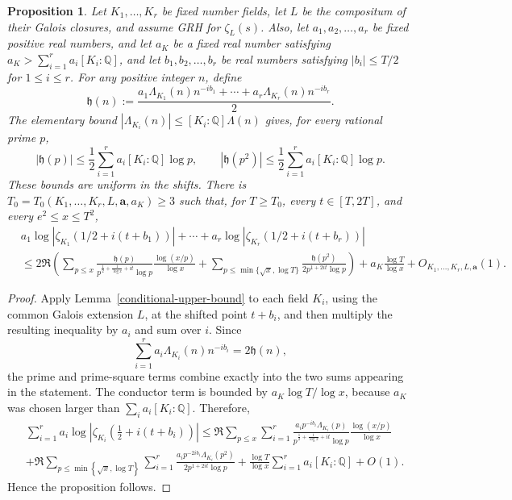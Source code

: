 \documentclass[twoside,reqno,11pt,a4paper]{amsart}
\numberwithin{equation}{section}
\theoremstyle{plain}
\newtheorem{prop}[thm]{Proposition}
\theoremstyle{definition}
\theoremstyle{remark}
\renewcommand{\le}{\leqslant}
\renewcommand{\ge}{\geqslant}
\begin{document}
	\begin{prop}\label{main-prop} 
Let $K_1,\ldots, K_r$ be fixed number fields, let $L$ be the compositum of their Galois closures, and assume GRH for $\zeta_L(s)$. Also, let $a_1,a_2,\ldots,a_r$  be fixed positive real numbers, and let $a_K$ be a fixed real number satisfying $a_K>\sum_{i=1}^r a_i[K_i:\mathbb{Q}]$,
and let $b_1,b_2,\ldots,b_r$ be real numbers satisfying
$|b_i|\le  T/2$ for $1\le  i\le  r$. For any positive integer $n$, define
\begin{equation}\label{eq:def-h}
\mathfrak{h}(n):=\frac{a_1\Lambda_{K_1}(n)n^{-ib_1}+\cdots+a_r\Lambda_{K_r}(n)n^{-ib_r}}{2}.
\end{equation}
The elementary bound $|\Lambda_{K_i}(n)|\le[K_i:\mathbb Q]\Lambda(n)$ gives, for every rational prime $p$,
\begin{equation}\label{eq:h-prime-uniform-bounds}
        |\mathfrak h(p)|\le\frac12\sum_{i=1}^ra_i[K_i:\mathbb Q]\log p,
        \qquad
        |\mathfrak h(p^2)|\le\frac12\sum_{i=1}^ra_i[K_i:\mathbb Q]\log p.
\end{equation}
These bounds are uniform in the shifts.
There is $T_0=T_0(K_1,\ldots,K_r,L,\mathbf a,a_K)\ge3$ such that, for $T\ge T_0$, every $t\in[T,2T]$, and every $e^2\le x\le T^2$, \begin{align*}
			&a_1\log\left| \zeta_{K_1}\left(1/2+i(t+b_1)\right)\right| +\cdots + 	a_r\log\left| \zeta_{K_r}\left(1/2+i(t+b_r)\right)\right| \\
			& \le  2\Re\left( \sum_{p\le  x} \frac{\mathfrak{h}(p)}{p^{\frac{1}{2}+\frac{1}{\log x}+it}\log p} \frac{\log\left(x/p\right)}{\log x}+ \sum_{p\le  \min\{ \sqrt{x},\log T\}} \frac{\mathfrak{h}(p^2)}{2p^{1+2it}\log p}\right) + a_K \frac{\log T}{\log x} +O_{K_1,\ldots,K_r,L,\mathbf a}(1).
		\end{align*}
	\end{prop}
	\begin{proof}
Apply Lemma~\ref{conditional-upper-bound} to each field $K_i$, using the common Galois extension $L$, at the shifted point $t+b_i$, and then multiply the resulting inequality by $a_i$ and sum over $i$.  Since
\begin{equation*}
        \sum_{i=1}^ra_i\Lambda_{K_i}(n)n^{-ib_i}=2\mathfrak h(n),
\end{equation*}
the prime and prime-square terms combine exactly into the two sums appearing in the statement.  The conductor term is bounded by $a_K\log T/\log x$, because $a_K$ was chosen larger than $\sum_i a_i[K_i:\mathbb Q]$. Therefore,
		\begin{align*}
		&	\sum_{i=1}^r a_i \log|\zeta_{K_i}\left(\tfrac{1}{2}+i(t+b_i)\right)|\le \Re\sum_{p\le  x}	\sum_{i=1}^r  \frac{a_ip^{-ib_i}\Lambda_{K_i}(p)}{p^{\frac{1}{2}+\frac{1}{\log x}+ it}\log p} \frac{\log\left(x/p\right)}{\log x}\\
			&+ \Re\sum_{p \le  \min\left\{\sqrt{x}, \log T\right\}}	\sum_{i=1}^r  \frac{a_i p^{-2ib_i}\Lambda_{K_i}(p^2)}{2p^{1+2it}\log p}
		+\frac{\log T}{\log x}\sum_{i=1}^ra_i[K_i:\mathbb{Q}] +O(1).
		\end{align*}
	Hence the proposition follows.
	\end{proof}
    
\end{document}
